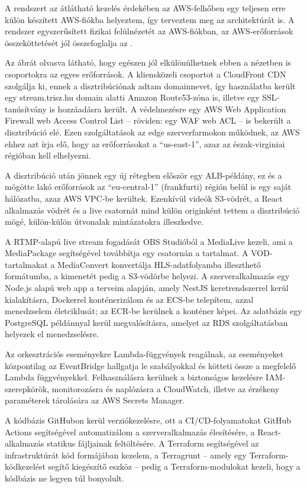 A rendszert az átlátható kezelés érdekében az AWS-felhőben egy teljesen erre külön készített AWS-fiókba helyeztem, így terveztem meg az architektúrát is. A rendszer egyszerűsített fizikai felülnézetét az AWS-fiókban, az AWS-erőforrások összeköttetését jól összefoglalja az .

Az ábrát olvasva látható, hogy egészen jól elkülönülhetnek ebben a nézetben is csoportokra az egyes erőforrások. A kliensközeli csoportot a CloudFront CDN szolgálja ki, ennek a disztribúciónak adtam domainnevet, így használatba került egy stream.trisz.hu domain alatti Amazon Route53-zóna is, illetve egy SSL-tanúsítvány is hozzáadásra került. A védelmezésre egy AWS Web Application Firewall web Access Control List -- röviden: egy WAF web ACL -- is bekerült a disztribúció elé. Ezen szolgáltatások az edge szerverfarmokon működnek, az AWS ehhez azt írja elő, hogy az erőforrásokat a ``us-east-1'', azaz az észak-virginiai régióban kell elhelyezni.

A disztribúció után jönnek egy új rétegben először egy ALB-példány, ez és a mögötte lakó erőforrások az ``eu-central-1'' (frankfurti) régión belül is egy saját hálózatba, azaz AWS VPC-be kerültek. Ezenkívül videók S3-vödrét, a React alkalmazás vödrét és a live csatornát mind külön originként tettem a disztribúció mögé, külön-külön útvonalak mintázatokra illeszkedve.

A RTMP-alapú live stream fogadását OBS Studióból a MediaLive kezeli, ami a MediaPackage segítségével továbbítja egy csatornán a tartalmat. A VOD-tartalmakat a MediaConvert konvertálja HLS-adatfolyamba illeszthető formátumba, a kimenetét pedig a S3-vödörbe helyezi. A szerveralkalmazás egy Node.js alapú web app a terveim alapján, amely NestJS keretrendszerrel kerül kialakításra, Dockerrel konténerizálom és az ECS-be telepítem, azzal menedzselem életciklusát; az ECR-be kerülnek a konténer képei. Az adatbázis egy PostgreSQL példánnyal kerül megvalósításra, amelyet az RDS szolgáltatásban helyezek el menedzselésre.

Az orkesztrációs eseményekre Lambda-függvények reagálnak, az eseményeket központilag az EventBridge hallgatja le szabályokkal és kötteti össze a megfelelő Lambda függvényekkel. Felhasználásra kerülnek a biztonságos kezelésre IAM-szerepkörök, monitorozásra és naplózásra a CloudWatch, illetve az érzékeny paraméterek tárolására az AWS Secrets Manager.

A kódbázis GitHubon kerül verziókezelésre, ott a CI/CD-folyamatokat GitHub Actions segítségével automatizálom a szerveralkalmazás élesítésére, a React-alkalmazás statikus fájljainak feltöltésére. A Terraform segítségével az infrastruktúrát kód formájában kezelem, a Terragrunt -- amely egy Terraform-kódkezelést segítő kiegészítő eszköz -- pedig a Terraform-modulokat kezeli, hogy a kódbázis ne legyen túl bonyolult.

